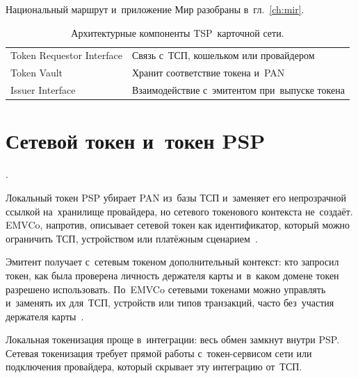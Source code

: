 Национальный маршрут и~приложение Мир разобраны в~гл.~\ref{ch:mir}.

\begin{table}[tbp]
  \caption{Архитектурные компоненты TSP~карточной сети.}\label{tab:token-tsp-comparison}
  \begingroup
  \tablesetup
  \begin{tabularx}{0.82\textwidth}{
      @{}P{0.28\textwidth}
      Y@{}
    }
    \toprule
    \headrow
     &  \\
    \midrule
    Token Requestor Interface & Связь с~ТСП, кошельком или провайдером \\
    \rowsep
    Token Vault & Хранит соответствие токена и~PAN \\
    \rowsep
    Issuer Interface & Взаимодействие с~эмитентом при~выпуске токена \\
    \bottomrule
  \end{tabularx}\par
  \endgroup
\end{table}

\section{Сетевой токен и~токен PSP}\label{sec:token-network-vs-psp}

.

Локальный токен PSP убирает PAN из~базы ТСП и~заменяет его непрозрачной ссылкой
на~хранилище провайдера, но сетевого токенового контекста не~создаёт.
EMVCo, напротив, описывает сетевой токен как идентификатор, который можно
ограничить ТСП, устройством или платёжным
сценарием~\cite{emvco-payment-tokenisation,emvco-payment-tokenisation-guide}.

Эмитент получает с~сетевым токеном дополнительный контекст: кто запросил токен,
как была проверена личность держателя карты и~в~каком домене токен разрешено
использовать. По~EMVCo сетевыми токенами можно управлять
и~заменять их для~ТСП, устройств или типов транзакций, часто без~участия
держателя карты~\cite{emvco-payment-tokenisation}.

Локальная токенизация проще в~интеграции: весь обмен замкнут внутри PSP.
Сетевая токенизация требует прямой работы с~токен-сервисом сети или подключения
провайдера, который скрывает эту интеграцию от~ТСП.

